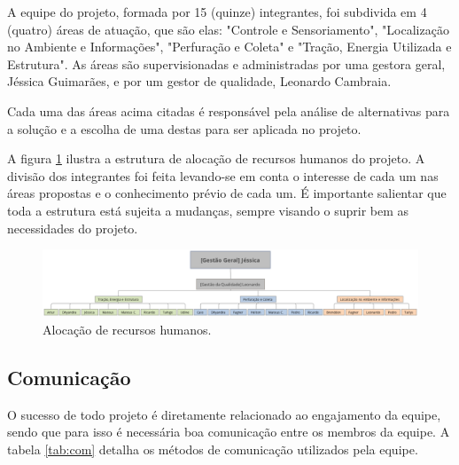       A equipe do projeto, formada por 15 (quinze) integrantes, foi
      subdivida em 4 (quatro) áreas de atuação, que são elas: "Controle
      e Sensoriamento", "Localização no Ambiente e Informações", "Perfuração
      e Coleta" e "Tração, Energia Utilizada e Estrutura". As áreas são
      supervisionadas e administradas por uma gestora geral, Jéssica Guimarães,
      e por um gestor de qualidade, Leonardo Cambraia.
      
      Cada uma das áreas acima citadas é responsável pela análise de alternativas
      para a solução e a escolha de uma destas para ser aplicada no projeto.
      
      A figura \ref{fig:aloc} ilustra a estrutura de alocação de recursos humanos do
      projeto. A divisão dos integrantes foi feita levando-se em conta o
      interesse de cada um nas áreas propostas e o conhecimento prévio de
      cada um. É importante salientar que toda a estrutura está sujeita a
      mudanças, sempre visando o suprir bem as necessidades do projeto.

      \begin{figure}[!htbp]
      \begin{center}
      \includegraphics[width=\textwidth]{figuras/alocacao.eps}
      \caption{\label{fig:aloc}Alocação de recursos humanos.}
      \end{center}
      \end{figure}

    \subsection{Comunicação}

      O sucesso de todo projeto é diretamente relacionado ao engajamento
      da equipe, sendo que para isso é necessária boa comunicação entre os
      membros da equipe. A tabela \ref{tab:com} detalha os métodos de comunicação
      utilizados pela equipe.

